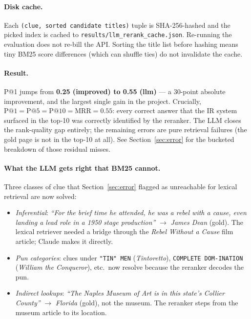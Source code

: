 \documentclass[11pt]{article}
\begin{document}
\paragraph{Disk cache.} Each \texttt{(clue, sorted candidate titles)}
tuple is SHA-256-hashed and the picked index is cached to
\texttt{results/llm\_rerank\_cache.json}. Re-running the evaluation
does not re-bill the API. Sorting the title list before hashing means
tiny BM25 score differences (which can shuffle ties) do not invalidate
the cache.

\paragraph{Result.} P@1 jumps from \textbf{0.25 (improved) to 0.55
(llm)} --- a 30-point absolute improvement, and the largest single
gain in the project. Crucially,
$\text{P@1} = \text{P@5} = \text{P@10} = \text{MRR} = 0.55$: every
correct answer that the IR system surfaced in the top-10 was correctly
identified by the reranker. The LLM closes the rank-quality gap
entirely; the remaining errors are pure retrieval failures (the gold
page is not in the top-10 at all). See Section~\ref{sec:error} for
the bucketed breakdown of those residual misses.

\paragraph{What the LLM gets right that BM25 cannot.} Three classes of
clue that Section~\ref{sec:error} flagged as unreachable for lexical
retrieval are now solved:

\begin{itemize}
  \item \emph{Inferential}: \emph{``For the brief time he attended, he
        was a rebel with a cause, even landing a lead role in a 1950
        stage production''} $\to$ \emph{James Dean} (gold). The
        lexical retriever needed a bridge through the
        \emph{Rebel Without a Cause} film article; Claude makes it
        directly.
  \item \emph{Pun categories}: clues under \texttt{"TIN" MEN}
        (\emph{Tintoretto}), \texttt{COMPLETE DOM-INATION}
        (\emph{William the Conqueror}), etc.\ now resolve because the
        reranker decodes the pun.
  \item \emph{Indirect lookups}: \emph{``The Naples Museum of Art is
        in this state's Collier County''} $\to$ \emph{Florida} (gold),
        not the museum. The reranker steps from the museum article to
        its location.
\end{itemize}
\end{document}
